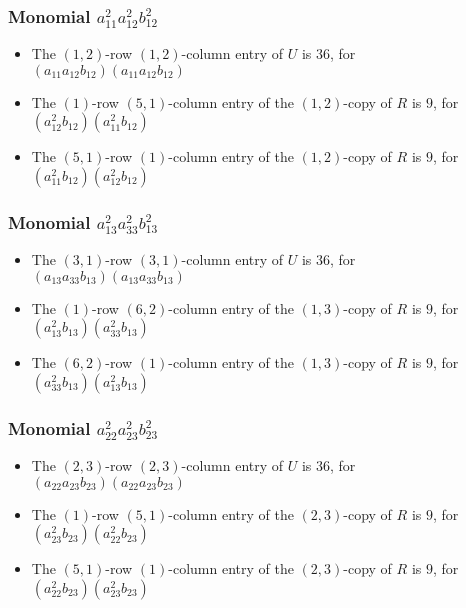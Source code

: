 \documentclass{article}
\begin{document}
\subsubsection{Monomial $ a_{11}^{2} a_{12}^{2} b_{12}^{2} $}

\begin{itemize}
\item The $ \left(1, 2\right) $-row $ \left(1, 2\right) $-column entry of $U$ is $ 36 $, for $( a_{11} a_{12} b_{12} )( a_{11} a_{12} b_{12} )$ 
\item The $(1)$-row $(5, 1)$-column entry of the $ \left(1, 2\right) $-copy of $R$ is $ 9 $, for $( a_{12}^{2} b_{12} )( a_{11}^{2} b_{12} )$ 
\item The $(5, 1)$-row $(1)$-column entry of the $ \left(1, 2\right) $-copy of $R$ is $ 9 $, for $( a_{11}^{2} b_{12} )( a_{12}^{2} b_{12} )$ 
\end{itemize}
\subsubsection{Monomial $ a_{13}^{2} a_{33}^{2} b_{13}^{2} $}

\begin{itemize}
\item The $ \left(3, 1\right) $-row $ \left(3, 1\right) $-column entry of $U$ is $ 36 $, for $( a_{13} a_{33} b_{13} )( a_{13} a_{33} b_{13} )$ 
\item The $(1)$-row $(6, 2)$-column entry of the $ \left(1, 3\right) $-copy of $R$ is $ 9 $, for $( a_{13}^{2} b_{13} )( a_{33}^{2} b_{13} )$ 
\item The $(6, 2)$-row $(1)$-column entry of the $ \left(1, 3\right) $-copy of $R$ is $ 9 $, for $( a_{33}^{2} b_{13} )( a_{13}^{2} b_{13} )$ 
\end{itemize}
\subsubsection{Monomial $ a_{22}^{2} a_{23}^{2} b_{23}^{2} $}

\begin{itemize}
\item The $ \left(2, 3\right) $-row $ \left(2, 3\right) $-column entry of $U$ is $ 36 $, for $( a_{22} a_{23} b_{23} )( a_{22} a_{23} b_{23} )$ 
\item The $(1)$-row $(5, 1)$-column entry of the $ \left(2, 3\right) $-copy of $R$ is $ 9 $, for $( a_{23}^{2} b_{23} )( a_{22}^{2} b_{23} )$ 
\item The $(5, 1)$-row $(1)$-column entry of the $ \left(2, 3\right) $-copy of $R$ is $ 9 $, for $( a_{22}^{2} b_{23} )( a_{23}^{2} b_{23} )$ 
\end{itemize}
\end{document}
